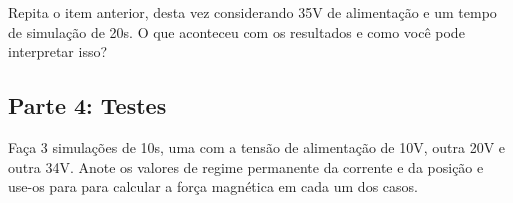 \documentclass[a4paper]{article}
\theoremstyle{definition}
\theoremstyle{plain}
\begin{document}
Repita o item anterior, desta vez considerando 35V de alimentação e um tempo de simulação de 20s. O que aconteceu com os resultados e como você pode interpretar isso?



\subsection{Parte 4: Testes}

Faça 3 simulações de 10s, uma com a tensão de alimentação de 10V, outra 20V e outra 34V. Anote os valores de regime permanente da corrente e da posição e use-os para para calcular a força magnética em cada um dos casos.





\end{document}
